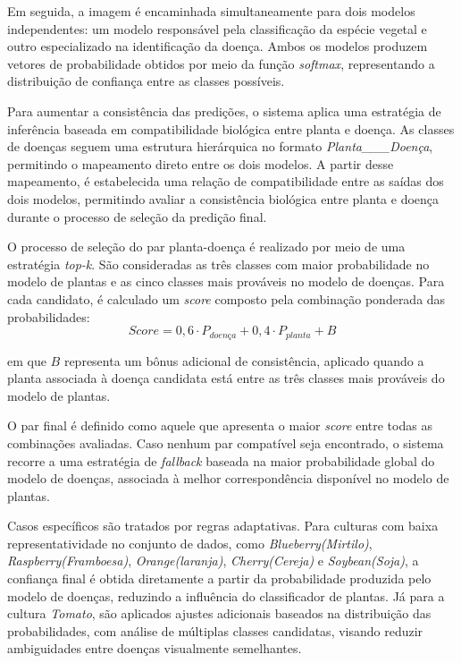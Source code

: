 \documentclass[portuguese]{sbc2025}%
\begin{document}
Em seguida, a imagem é encaminhada simultaneamente para dois modelos independentes: um modelo responsável pela classificação 
da espécie vegetal e outro especializado na identificação da doença. Ambos os modelos produzem vetores de probabilidade obtidos
por meio da função \textit{softmax}, representando a distribuição de confiança entre as classes possíveis.

Para aumentar a consistência das predições, o sistema aplica uma estratégia de inferência baseada em compatibilidade biológica
entre planta e doença. As classes de doenças seguem uma estrutura hierárquica no formato \textit{Planta\_\_\_Doença}, permitindo
o mapeamento direto entre os dois modelos. A partir desse mapeamento, é estabelecida uma relação de compatibilidade entre as 
saídas dos dois modelos, permitindo avaliar a consistência biológica entre planta e doença durante o processo de seleção da 
predição final.

O processo de seleção do par planta-doença é realizado por meio de uma estratégia \textit{top-k}. São consideradas as três 
classes com maior probabilidade no modelo de plantas e as cinco classes mais prováveis no modelo de doenças. Para cada candidato,
é calculado um \textit{score} composto pela combinação ponderada das probabilidades:
\begin{equation} Score = 0{,}6 \cdot P_{doença} + 0{,}4 \cdot P_{planta} + B \end{equation}

em que $B$ representa um bônus adicional de consistência, aplicado quando a planta associada à doença candidata está entre as 
três classes mais prováveis do modelo de plantas.

O par final é definido como aquele que apresenta o maior \textit{score} entre todas as combinações avaliadas. Caso nenhum par 
compatível seja encontrado, o sistema recorre a uma estratégia de \textit{fallback} baseada na maior probabilidade global do 
modelo de doenças, associada à melhor correspondência disponível no modelo de plantas.

Casos específicos são tratados por regras adaptativas. Para culturas com baixa representatividade no conjunto de dados, como
\textit{Blueberry(Mirtilo)}, \textit{Raspberry(Framboesa)}, \textit{Orange(laranja)}, \textit{Cherry(Cereja)} e \textit{Soybean(Soja)}, a confiança final é obtida diretamente a partir 
da probabilidade produzida pelo modelo de doenças, reduzindo a influência do classificador de plantas. Já para a cultura
\textit{Tomato}, são aplicados ajustes adicionais baseados na distribuição das probabilidades, com análise de múltiplas 
classes candidatas, visando reduzir ambiguidades entre doenças visualmente semelhantes.
\end{document}
